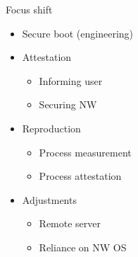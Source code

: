\documentclass[]{beamer}
\begin{document}
\begin{frame}{Focus shift}
\begin{itemize}
\item Secure boot (engineering)
\item Attestation \begin{itemize}
\item Informing user
\item Securing NW
\end{itemize}
\item Reproduction \begin{itemize}
\item Process measurement
\item Process attestation
\end{itemize}
\item Adjustments \begin{itemize}
\item Remote server
\item Reliance on NW OS
\end{itemize}
\end{itemize}
\end{frame}
\end{document}

